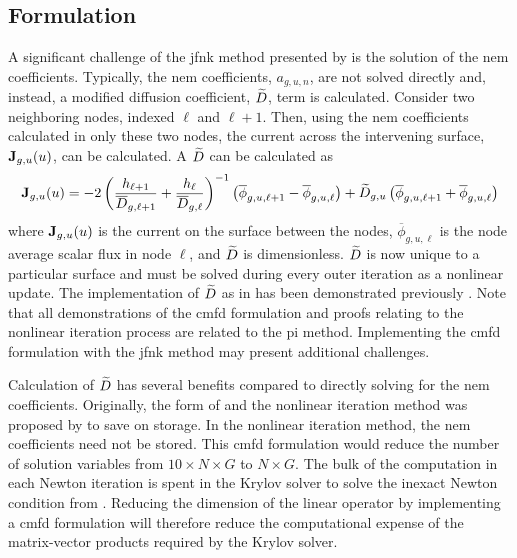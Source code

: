   \subsection{ Formulation}
    \label{sec:cmfd_formulation}

    A significant challenge of the \gls{jfnk} method presented by
    \citeauthor{qe2paper} is the solution of the \gls{nem} coefficients.
    Typically, the \gls{nem} coefficients, $a_{g,u,n}$, are not solved directly
    and, instead, a modified diffusion coefficient, $\widetilde{D}$, term is
    calculated. Consider two neighboring nodes, indexed $\ell$ and $\ell+1$.
    Then, using the \gls{nem} coefficients calculated in only these two nodes,
    the current across the intervening surface, $\mathbf{J}_{g,u}(u)$, can be
    calculated. A $\widetilde{D}$ can be calculated as
    \begin{equation}
      \label{eq:dtilde}
      \mathbf{J}_{g,u}(u) = 
        -2 \left( \frac{h_{\ell+1}}{\overline{D}_{g,\ell+1}} + 
          \frac{h_{\ell}}{\overline{D}_{g,\ell}} \right)^{-1}
          \left( \overline{\phi}_{g,u,\ell+1} -
          \overline{\phi}_{g,u,\ell} \right) + 
        \widetilde{D}_{g,u} \left( \overline{\phi}_{g,u,\ell+1} +
          \overline{\phi}_{g,u,\ell} \right)
    \end{equation}
    where $\mathbf{J}_{g,u}(u)$ is the current on the surface between the nodes,
    $\overline{\phi}_{g,u,\ell}$ is the node average scalar flux in node $\ell$,
    and $\widetilde{D}$ is dimensionless. $\widetilde{D}$ is now unique to a particular
    surface and must be solved during every outer iteration as a nonlinear
    update. The implementation of $\widetilde{D}$ as in  has been
    demonstrated previously \cite{smith_nonlinear,palmtagThesis}. Note that all
    demonstrations of the \gls{cmfd} formulation and proofs relating to the
    nonlinear iteration process are related to the \gls{pi} method. Implementing
    the \gls{cmfd} formulation with the \gls{jfnk} method may present additional
    challenges.

    Calculation of $\widetilde{D}$ has several benefits compared to directly solving
    for the \gls{nem} coefficients. Originally, the form of  and
    the nonlinear iteration method was proposed by \citeauthor{smith_nonlinear}
    to save on storage. In the nonlinear iteration method, the \gls{nem}
    coefficients need not be stored. This \gls{cmfd} formulation would reduce
    the number of solution variables from ${10 \times N \times G}$ to 
    ${N \times G}$. The bulk of the computation in each Newton iteration is
    spent in the Krylov solver to solve the inexact Newton condition from
    . Reducing the dimension of the linear
    operator by implementing a \gls{cmfd} formulation will therefore reduce the
    computational expense of the matrix-vector products required by the Krylov
    solver.

